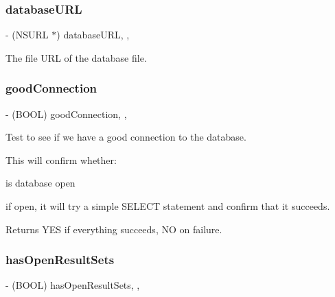 \subsubsection{\texorpdfstring{database\+U\+RL}{databaseURL}}
{\footnotesize\ttfamily -\/ (N\+S\+U\+RL $\ast$) database\+U\+RL\hspace{0.3cm}{\ttfamily [read]}, {\ttfamily [nonatomic]}, {\ttfamily [assign]}}

The file U\+RL of the database file. \mbox{\label{interface_o_p_t_l_y_f_m_d_b_database_ae9afe3b7a030648d6f719f53678bb9ba}} 
\subsubsection{\texorpdfstring{good\+Connection}{goodConnection}}
{\footnotesize\ttfamily -\/ (B\+O\+OL) good\+Connection\hspace{0.3cm}{\ttfamily [read]}, {\ttfamily [nonatomic]}, {\ttfamily [assign]}}

Test to see if we have a good connection to the database.

This will confirm whether\+:


\begin{DoxyItemize}
\item is database open
\item if open, it will try a simple S\+E\+L\+E\+CT statement and confirm that it succeeds.
\end{DoxyItemize}

\begin{DoxyReturn}{Returns}
{\ttfamily Y\+ES} if everything succeeds, {\ttfamily NO} on failure. 
\end{DoxyReturn}
\mbox{\label{interface_o_p_t_l_y_f_m_d_b_database_a0fb326e01f4c551f821558e71709c104}} 
\subsubsection{\texorpdfstring{has\+Open\+Result\+Sets}{hasOpenResultSets}}
{\footnotesize\ttfamily -\/ (B\+O\+OL) has\+Open\+Result\+Sets\hspace{0.3cm}{\ttfamily [read]}, {\ttfamily [nonatomic]}, {\ttfamily [assign]}}

